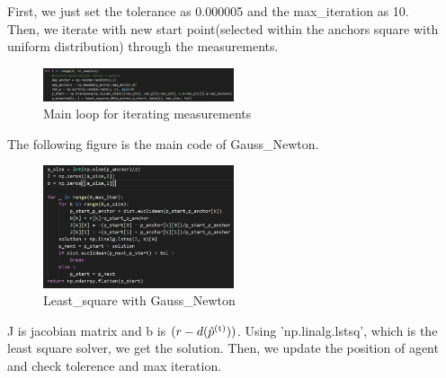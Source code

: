 \documentclass[a4paper]{article}
\begin{document}
First, we just set the tolerance as 0.000005 and the max\_iteration as 10.\\
Then, we iterate with new start point(selected within the anchors square with uniform distribution) through the measurements.
\begin{figure}[h]
	\begin{center}
		\includegraphics[width=0.5\textwidth]{gauss_newton.jpg}
		\caption{Main loop for iterating measurements}
	\end{center}
\end{figure}
\clearpage
The following figure is the main code of Gauss\_Newton.\\
\begin{figure}[h]
	\begin{center}
		\includegraphics[width=0.5\textwidth]{least_square.jpg}
		\caption{Least\_square with Gauss\_Newton}
	\end{center}
\end{figure}

J is jacobian matrix and b is $(r-d(\hat{p}\textsuperscript{(t)}))$.
Using 'np.linalg.lstsq', which is the least square solver, we get the solution. Then, we update the position of agent and check tolerence and max iteration.

\clearpage
\end{document}
